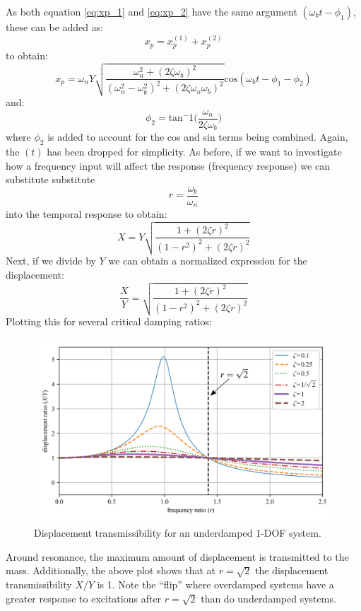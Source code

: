 \documentclass[12pt,letter]{article}
\numberwithin{ex}{section} %
\numberwithin{re}{section} %
\begin{document}
				As both equation \ref{eq:xp_1} and \ref{eq:xp_2}  have the same argument $(\omega_b t - \phi_1)$, these can be added as:
				\begin{equation}
					x_p = 	x_p^{(1)} + x_p^{(2)}
				\end{equation}
				to obtain:
				\begin{equation}
					x_p = 	\omega_n Y   \sqrt{\frac{\omega_n^2 + (2 \zeta \omega_b)^2 }{(\omega_n^2 - \omega_b^2)^2 +  (2\zeta \omega_n \omega_b)^2} }  \text{cos}(\omega_bt - \phi_1 - \phi_2)
				\end{equation}
				and:
				\begin{equation}
					\phi_2 = \text{tan}^-1\bigg(\frac{\omega_n}{2\zeta \omega_b}\bigg)
				\end{equation}
				where $\phi_2$ is added to account for the cos and sin terms being combined. Again, the $(t)$ has been dropped for simplicity. As before, if we want to investigate how a frequency input will affect the response (frequency response) we can substitute substitute 
				\begin{equation}
				r=\frac{\omega_b}{\omega_n}
				\end{equation} 
				into the temporal response to obtain:
				\begin{equation}
				X = Y \sqrt{\frac{1+(2 \zeta r)^2}{(1-r^2)^2 + (2 \zeta r )^2}} 
				\end{equation} 
				Next, if we divide by $Y$ we can obtain a normalized expression for the displacement:
				\begin{equation}
				\frac{X}{Y} = \sqrt{\frac{1+(2 \zeta r)^2}{(1-r^2)^2 + (2 \zeta r )^2}} 
				\end{equation} 
				Plotting this for several critical damping ratios:
				\begin{figure}[H]
					\centering
					\includegraphics[]{../Figures/base_excitation_displacement_transmissibility.png}
					\caption{Displacement transmissibility for an underdamped 1-DOF system.}
				\end{figure}
				Around resonance, the maximum amount of displacement is transmitted to the mass. Additionally,  the above plot shows that at $r=\sqrt{2}$ the displacement transmissibility $X/Y$ is 1. Note the ``flip'' where overdamped systems have a greater response to excitations after $r=\sqrt{2}$ than do underdamped systems.
\end{document}
